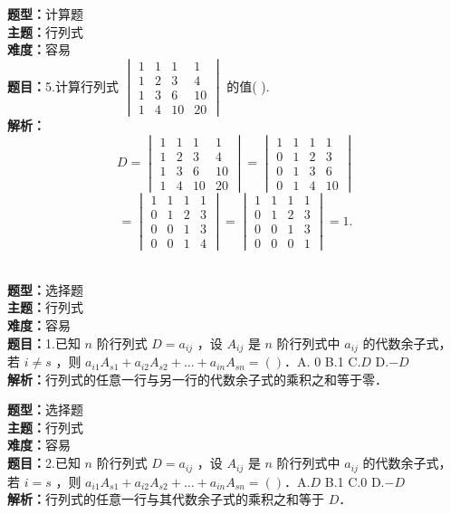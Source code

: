 \documentclass{ctexart}
\newenvironment{question}[5]{%
	\noindent\textbf{题型：}#1\\
	\textbf{主题：}#2\\
	\textbf{难度：}#3\\
	\textbf{题目：}#4\\
	\textbf{解析：}#5\\
	\vspace{1em}
}{}
\begin{document}
	\begin{question}
		{计算题}
		{行列式}
		{容易}
		{5.计算行列式 \(\begin{vmatrix}1 & 1 & 1 & 1 \\ 1 & 2 & 3 & 4 \\ 1 & 3 & 6 & 10 \\ 1 & 4 & 10 & 20\end{vmatrix}\) 的值(  ).}
		{
			\[
			D = \begin{vmatrix}
				1 & 1 & 1 & 1 \\
				1 & 2 & 3 & 4 \\
				1 & 3 & 6 & 10 \\
				1 & 4 & 10 & 20
			\end{vmatrix} =
			\begin{vmatrix}
				1 & 1 & 1 & 1 \\
				0 & 1 & 2 & 3 \\
				0 & 1 & 3 & 6 \\
				0 & 1 & 4 & 10
			\end{vmatrix}
			\]
			\[
			=
			\begin{vmatrix}
				1 & 1 & 1 & 1 \\
				0 & 1 & 2 & 3 \\
				0 & 0 & 1 & 3 \\
				0 & 0 & 1 & 4
			\end{vmatrix} =
			\begin{vmatrix}
				1 & 1 & 1 & 1 \\
				0 & 1 & 2 & 3 \\
				0 & 0 & 1 & 3 \\
				0 & 0 & 0 & 1
			\end{vmatrix} = 1.
			\]}
	\end{question}
	
	\begin{question}
		{选择题}
		{行列式}
		{容易}
		{1.已知 \(n\) 阶行列式 \(D=a_{i j}\) ，设 \(A_{i j}\) 是 \(n\) 阶行列式中 \(a_{i j}\) 的代数余子式，若 \(i \neq s\) ，则 \(a_{i 1} A_{s 1}+a_{i 2} A_{s 2}+\ldots+a_{i n} A_{s n}=(  )\)．A. 0 B.1 C.\(D\) D.\(-D\)}
		{行列式的任意一行与另一行的代数余子式的乘积之和等于零．}
	\end{question}
	
	
	\begin{question}
		{选择题}
		{行列式}
		{容易}
		{2.已知 \(n\) 阶行列式 \(D=a_{i j}\) ，设 \(A_{i j}\) 是 \(n\) 阶行列式中 \(a_{i j}\) 的代数余子式，若 \(i=s\) ，则 \(a_{i 1} A_{s 1}+a_{i 2} A_{s 2}+\ldots+a_{i n} A_{s n}=(  )\)．A.\(D\) B.1 C.0 D.\(-D\)}
		{行列式的任意一行与其代数余子式的乘积之和等于 \(D\)．}
	\end{question}
	
\end{document}

